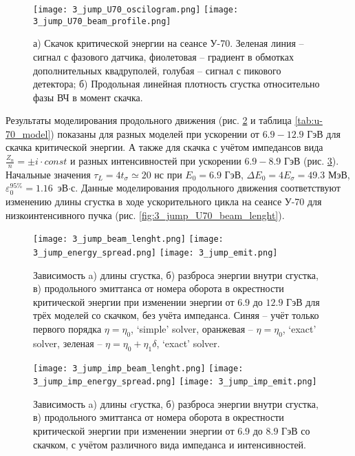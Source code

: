 \begin{figure}
   \texttt{[image: 3\_jump\_U70\_oscilogram.png]}
   \texttt{[image: 3\_jump\_U70\_beam\_profile.png]}
   \caption{а) Скачок критической энергии на сеансе У-70. Зеленая линия – сигнал с фазового датчика, фиолетовая – градиент в обмотках дополнительных квадруполей, голубая – сигнал с пикового детектора; б) Продольная линейная плотность сгустка относительно фазы ВЧ в момент скачка.}
   \label{fig:3_jump_U70_oscilogram}
\end{figure}

\par Результаты моделирования продольного движения (рис. \ref{fig:3_jump} и таблица \ref{tab:u-70_model}) показаны для разных моделей при ускорении от $6.9-12.9$ ГэВ для скачка критической энергии. А также для скачка с учётом импедансов вида $\frac{Z_n}{n}=\pm i\cdot const$ и разных интенсивностей при ускорении $6.9-8.9$ ГэВ (рис. \ref{fig:3_jump_imp}). Начальные значения $\tau_L=4t_\sigma\simeq20$ нс при $E_0=6.9$ ГэВ, $\Delta E_{0} = 4E_{\sigma} =49.3$ МэВ, $\varepsilon_{0}^{95\%}=1.16$~эВ$\cdot$с. Данные моделирования продольного движения соответствуют изменению длины сгустка в ходе ускорительного цикла на сеансе У-70 для низкоинтенсивного пучка (рис. \ref{fig:3_jump_U70_beam_lenght}).

\begin{figure}
   \texttt{[image: 3\_jump\_beam\_lenght.png]}
   \texttt{[image: 3\_jump\_energy\_spread.png]}
   \texttt{[image: 3\_jump\_emit.png]}
   \caption{Зависимость a) длины сгустка, б) разброса энергии внутри сгустка, в) продольного эмиттанса от номера оборота в окрестности критической энергии при изменении энергии от $6.9$ до $12.9$ ГэВ для трёх моделей со скачком, без учёта импеданса. Синяя – учёт только первого порядка $\eta=\eta_0$, ‘simple’ solver, оранжевая – $\eta=\eta_0$, ‘exact’ solver, зеленая – $\eta=\eta_0+\eta_1\delta$, ‘exact’ solver.}
   \label{fig:3_jump}
\end{figure}

\begin{figure}
   \texttt{[image: 3\_jump\_imp\_beam\_lenght.png]}
   \texttt{[image: 3\_jump\_imp\_energy\_spread.png]}
   \texttt{[image: 3\_jump\_imp\_emit.png]}
   \caption{Зависимость a) длины cгустка, б) разброса энергии внутри сгустка, в) продольного эмиттанса от номера оборота в окрестности критической энергии при изменении энергии от $6.9$ до $8.9$ ГэВ со скачком, с учётом различного вида импеданса и интенсивностей.}
   \label{fig:3_jump_imp}
\end{figure}

